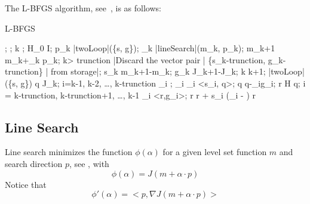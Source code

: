 The L-BFGS algorithm, see~\cite{Nocedal1980}, is as follows:
\begin{algorithm}
    \mbox{L-BFGS}
    \begin{program}
        \BEGIN
        ;
        ;
        k ;
        H_0 \leftarrow I;
        \WHILE \NOT{} \DO
        p_k \leftarrow |twoLoop|(\{s, g\});
        \alpha_k \leftarrow |lineSearch|(m_k, p_k); 
        m_{k+1} \leftarrow m_k+\alpha_k p_k;
        \IF k> trunction
        \THEN
            |Discard the vector pair | \{s_{k-trunction}, g_{k-trunction}\} | from storage|;
        \FI
        s_k \leftarrow m_{k+1}-m_k;
        g_k \leftarrow \nabla J_{k+1}-\nabla J_k;
        k \leftarrow k+1;
        \OD
        \WHERE
        \FUNCT |twoLoop|(\{s, g\}) \BODY
            \EXP q \leftarrow \nabla J_k;
            \FOR i=k-1, k-2, \ldots, k-trunction \DO
            \rho_i \leftarrow {};
            \alpha_i \leftarrow \rho_i <s_i, q>;
            q \leftarrow q-\alpha_i\cdot  g_i;
            \OD
            r \leftarrow H q;
            \FOR i = k-trunction, k-trunction+1, \ldots, k-1 \DO
            \beta \leftarrow \rho_i \cdot <r,g_i>;
            r \leftarrow r + s_i \cdot (\alpha_i - \beta)
            \OD
            r \ENDEXP \ENDFUNCT
        \END
    \end{program}
\end{algorithm}

\subsection{Line Search}\label{sec:LineSearch}
Line search minimizes the function $\phi(\alpha)$ for a given level set function $m$ and 
search direction $p$,  see \cite{Nocedal2006}, \cite{MoreThuente1992} with
\begin{equation}\label{EQU:MIN:22}
\phi(\alpha) = J(m+ \alpha \cdot  p)
\end{equation}
Notice that 
\begin{equation}\label{EQU:MIN:23}
\phi'(\alpha) = < p , \nabla J(m+\alpha \cdot p)> 
\end{equation}


